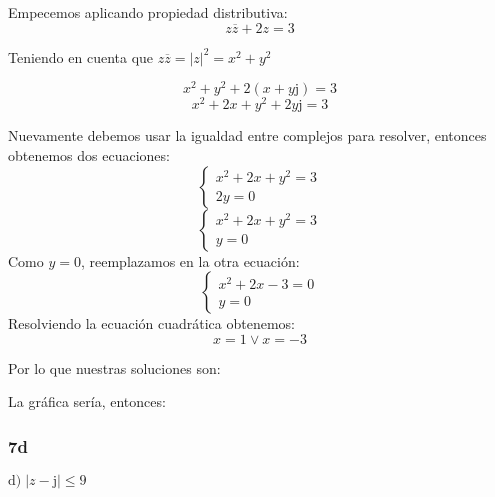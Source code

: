 \documentclass[11pt]{article}
\def\imj{\mathrm{j}}
\begin{document}
	Empecemos aplicando propiedad distributiva:
	$$z\overline{z}+2z=3$$
	\begin{center}
		Teniendo en cuenta que $z\overline{z}=\left\vert z \right\vert ^{2}=x^2+y^2$
	\end{center}
	$$x^2+y^2+2(x+y\imj)=3$$
	$$x^2+2x+y^2+2y\imj=3$$
	\begin{center}
		Nuevamente debemos usar la igualdad entre complejos para resolver, entonces obtenemos dos ecuaciones:
		$$\left\lbrace\begin{matrix}
		x^2+2x+y^2=3 \\
		2y=0
		\end{matrix}\right.$$
		$$\left\lbrace\begin{matrix}
		x^2+2x+y^2=3 \\
		y=0
		\end{matrix}\right.$$
		Como $y=0$, reemplazamos en la otra ecuación:
		$$\left\lbrace\begin{matrix}
		x^2+2x-3=0 \\
		y=0
		\end{matrix}\right.$$
		Resolviendo la ecuación cuadrática obtenemos:
		$$x=1\vee x=-3$$
	\end{center}
	Por lo que nuestras soluciones son:
	\begin{center}
	\end{center}
	La gráfica sería, entonces:
	\begin{center}
	\end{center}
	\subsubsection{7d}
	$\displaystyle{\mathrm{d)}\;\left\vert z-\imj \right\vert \leq9}$
	
\end{document}
